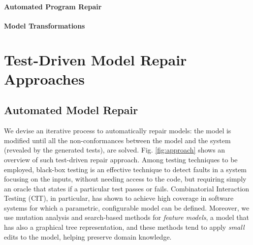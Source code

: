 \documentclass[
12pt, %
oneside, %
english, %
singlespacing, %
headsepline, %
consistentlayout, %
]{MastersDoctoralThesis} %
\theoremstyle{plain}
\theoremstyle{definition}
\theoremstyle{remark}
\theoremstyle{plain}
\theoremstyle{plain}
\theoremstyle{remark}
\begin{document}
\subsection{Automated Program Repair}
\subsection{Model Transformations}

\part{Test-Driven Model Repair Approaches}
\chapter{Automated Model Repair}

We devise an iterative process to automatically repair models: the model is modified until all the non-conformances between the model and the system (revealed by the generated tests), are solved. Fig. \ref{fig:approach} shows an overview of such test-driven repair approach. 
Among testing techniques to be employed, black-box testing is an effective technique to detect faults in a system focusing on the inputs, without needing access to the code, but requiring simply an oracle that states if a particular test %
passes or fails. 
Combinatorial Interaction Testing (CIT), in particular, has shown to achieve high coverage in software systems for which a parametric, configurable model can be defined. Moreover, we use mutation analysis and search-based methods for \textit{feature models}, a model that has also a graphical tree representation, and these methods tend to apply \textit{small} edits to the model, helping preserve domain knowledge.
\end{document}

